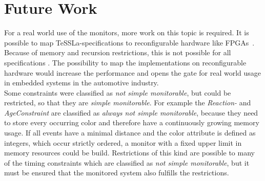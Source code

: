 \section{Future Work}
	For a real world use of the monitors, more work on this topic is required. It is possible to map TeSSLa-specifications to reconfigurable hardware like FPGAs~\cite{8342124}. Because of memory and recursion restrictions, this is not possible for all specifications . %
	The possibility to map the implementations on reconfigurable hardware would increase the performance and opens the gate for real world usage in embedded systems in the automotive industry.\\
	Some constraints were classified as \textit{not simple monitorable}, but could be restricted, so that they are \textit{simple monitorable}. For example the \textit{Reaction-} and \textit{AgeConstraint} are classified as \textit{always not simple monitorable}, because they need to store every occurring color and therefore have a continuously growing memory usage. If all events have a minimal distance and the color attribute is defined as integers, which occur strictly ordered, a monitor with a fixed upper limit in memory resources could be build. Restrictions of this kind are possible to many of the timing constraints which are classified as \textit{not simple monitorable}, but it must be ensured that the monitored system also fulfills the restrictions.






